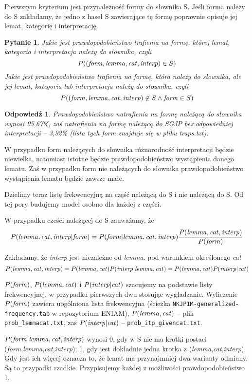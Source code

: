 \documentclass{article}
\newcommand{\form}{{\it form}}
\newcommand{\lemma}{{\it lemma}}
\newcommand{\cat}{{\it cat}}
\newcommand{\interp}{{\it interp}}
\newtheorem{task}{Pytanie}
\newtheorem{answer}{Odpowiedź}
\begin{document}

Pierwszym kryterium jest przynależność formy do słownika S. 
Jeśli forma należy do S zakładamy, że jedno z haseł S zawierające tę formę
poprawnie opisuje jej lemat, kategorię i interpretację.

\begin{task}
Jakie jest prawdopodobieństwo trafienia na formę, której lemat, kategoria i interpretacja należy do słownika, czyli
\[P((\form,\lemma,\cat,\interp) \in S)\]
Jakie jest prawdopodobieństwo trafienia na formę, która należy do słownika, ale jej lemat, kategoria lub interpretacja należy do słownika, czyli
\[P((\form,\lemma,\cat,\interp) \not\in S \wedge \form \in S)\]
\end{task}

\begin{answer}
Prawdopodobieństwo natrafienia na formę należącą do słownika wynosi 95,67\%, zaś natrafienia na formę należącą do SGJP bez odpowiedniej
interpretacji -- 3,92\% (lista tych form znajduje się w pliku traps.txt).
\end{answer}

W przypadku form należących do słownika różnorodność interpretacji będzie niewielka, 
natomiast istotne będzie prawdopodobieństwo wystąpienia danego lematu.
Zaś w przypadku form nie należących do słownika prawdopodobieństwo wystąpienia lematu
będzie zawsze małe.

Dzielimy teraz listę frekwencyjną na część należącą do S i nie należącą do S. 
Od tej pory budujemy model osobno dla każdej z części.

W przypadku cześci należącej do S zauważamy, że \[P(\lemma,\cat,\interp|\form)=P(\form|\lemma,\cat,\interp)\frac{P(\lemma,\cat,\interp)}{P(\form)}\]

Zakładamy, że \interp{} jest niezależne od \lemma, pod warunkiem określonego \cat
\[P(\lemma,\cat,\interp)=P(\lemma,\cat)P(\interp|\lemma,\cat)=P(\lemma,\cat)P(\interp|\cat)\]

$P(\form)$, $P(\lemma,\cat)$ i $P(\interp|\cat)$ szacujemy na podstawie listy frekwencyjnej,
w przypadku pierwszych dwu stosując wygładzanie. Wyliczenie $P(\form)$ zawiera uogólniona lista frekwencyjna
(ścieżka {\tt NKJP1M-generalized-frequency.tab} w repozytorium ENIAM), $P(\lemma,\cat)$ -- plik
 {\tt prob\_lemmacat.txt}, zaś $P(\interp|\cat)$ -- {\tt prob\_itp\_givencat.txt}.

$P(\form|\lemma,\cat,\interp)$ wynosi 0, gdy w S nie ma krotki postaci (\form,\lemma,\cat,\interp);
1, gdy jest dokładnie jedna krotka z (\lemma,\cat,\interp). Gdy jest ich więcej oznacza to, że
lemat ma przynajmniej dwa warianty odmiany. Są to przypadki rzadkie. Przypisujemy każdej z możliwości
prawdopodobieństwo 1.
\end{document}
